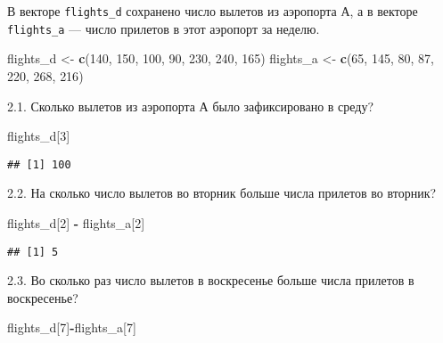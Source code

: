 \documentclass[
]{article}
\newenvironment{Shaded}{\begin{snugshade}}{\end{snugshade}}
\newcommand{\DecValTok}[1]{\textcolor[rgb]{0.00,0.00,0.81}{#1}}
\newcommand{\KeywordTok}[1]{\textcolor[rgb]{0.13,0.29,0.53}{\textbf{#1}}}
\newcommand{\NormalTok}[1]{#1}
\newcommand{\OperatorTok}[1]{\textcolor[rgb]{0.81,0.36,0.00}{\textbf{#1}}}
\newcommand{\StringTok}[1]{\textcolor[rgb]{0.31,0.60,0.02}{#1}}
\begin{document}
В векторе \texttt{flights\_d} сохранено число вылетов из аэропорта А, а
в векторе \texttt{flights\_a} --- число прилетов в этот аэропорт за
неделю.

\begin{Shaded}
\begin{Highlighting}[]
\NormalTok{flights_d <-}\StringTok{ }\KeywordTok{c}\NormalTok{(}\DecValTok{140}\NormalTok{, }\DecValTok{150}\NormalTok{, }\DecValTok{100}\NormalTok{, }\DecValTok{90}\NormalTok{, }\DecValTok{230}\NormalTok{, }\DecValTok{240}\NormalTok{, }\DecValTok{165}\NormalTok{)}
\NormalTok{flights_a <-}\StringTok{ }\KeywordTok{c}\NormalTok{(}\DecValTok{65}\NormalTok{, }\DecValTok{145}\NormalTok{, }\DecValTok{80}\NormalTok{, }\DecValTok{87}\NormalTok{, }\DecValTok{220}\NormalTok{, }\DecValTok{268}\NormalTok{, }\DecValTok{216}\NormalTok{)}
\end{Highlighting}
\end{Shaded}

2.1. Сколько вылетов из аэропорта А было зафиксировано в среду?

\begin{Shaded}
\begin{Highlighting}[]
\NormalTok{flights_d[}\DecValTok{3}\NormalTok{]}
\end{Highlighting}
\end{Shaded}

\begin{verbatim}
## [1] 100
\end{verbatim}

2.2. На сколько число вылетов во вторник больше числа прилетов во
вторник?

\begin{Shaded}
\begin{Highlighting}[]
\NormalTok{flights_d[}\DecValTok{2}\NormalTok{] }\OperatorTok{-}\StringTok{ }\NormalTok{flights_a[}\DecValTok{2}\NormalTok{]}
\end{Highlighting}
\end{Shaded}

\begin{verbatim}
## [1] 5
\end{verbatim}

2.3. Во сколько раз число вылетов в воскресенье больше числа прилетов в
воскресенье?

\begin{Shaded}
\begin{Highlighting}[]
\NormalTok{flights_d[}\DecValTok{7}\NormalTok{]}\OperatorTok{-}\NormalTok{flights_a[}\DecValTok{7}\NormalTok{]}
\end{Highlighting}
\end{Shaded}
\end{document}
